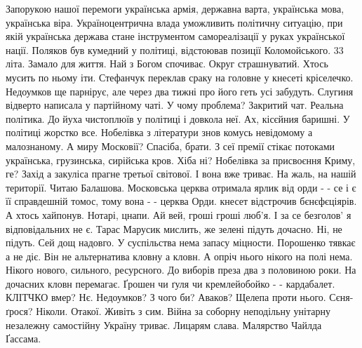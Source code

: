 Запорукою нашої перемоги українська армія, державна варта, українська
мова, українська віра. Україноцентрична влада уможливить політичну ситуацію,
при якій українська держава стане інструментом самореалізації у руках
української нації. Поляков був кумедний у політиці, відстоював позиції
Коломойського. 33 літа. Замало для життя. Най з Богом спочиває. Округ
страшнуватий. Хтось мусить по ньому іти. Стефанчук переклав сраку на головне у
кнесеті кріселечко. Недоумков ще парнірує, але через два тижні про його геть
усі забудуть. Слугиня відверто написала у партійному чаті. У чому проблема?
Закритий чат. Реальна політика. До йуха чистоплюїв у політиці і довкола неї.
Ах, кісєйния баришні. У політиці жорстко все. Нобелівка з літератури знов
комусь невідомому а малознаному. А миру Московії? Спасіба, брати. З сеї премії
стікає потоками українська, грузинська, сирійська кров. Хіба ні? Нобелівка за
присвоєння Криму, ге? Захід а закуліса прагне третьої світової. І вона вже
триває. На жаль, на нашій території. Читаю Балашова. Московська церква отримала
ярлик від орди - - се і є її справдешній томос, тому вона - - церква Орди.
кнесет відстрочив бєнєфєціярів. А хтось хайпонув. Нотарі, цнапи. Ай вей, гроші
гроші люб'я. І за се безголов' я відповідальних не є. Тарас Марусик мислить, же
зелені підуть дочасно. Ні, не підуть. Сей дощ надовго. У суспільства нема
запасу міцности. Порошенко тявкає а не діє. Він не альтернатива кловну а кловн.
А опріч нього нікого на полі нема. Нікого нового, сильного, ресурсного. До
виборів преза два з половиною роки. На дочасних кловн перемагає. Ґрошен чи ґуля
чи кремлейобойко - - кардабалет. КЛІТЧКО вмер? Нє. Недоумков? З чого би?
Аваков? Щелепа проти нього. Сєня-ґрося? Ніколи. Отакої. Живіть з сим. Війна за
соборну неподільну унітарну незалежну самостійну Україну триває. Лицарям слава.
Малярство Чайлда Ґассама.
